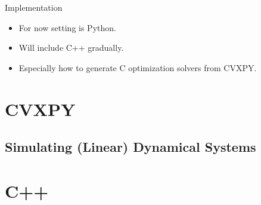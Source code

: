 \begin{chapter}{Implementation}

    \begin{itemize}
        \item For now setting is Python.
        \item Will include C++ gradually.
        \item Especially how to generate C optimization solvers from CVXPY.
    \end{itemize}

    \section{CVXPY}

    \subsection{Simulating (Linear) Dynamical Systems}

    \section{C++}






\end{chapter}
